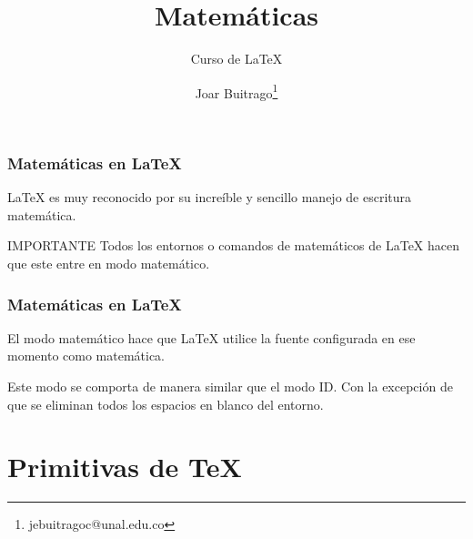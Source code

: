 \documentclass[12pt,aspectratio=169,ignorenonframetext]{ltxbeamer}
\title{Matemáticas}
\subtitle{Curso de {\lmr\LaTeX}}
\author{Joar Buitrago\texorpdfstring{\thanks{jebuitragoc@unal.edu.co}}{ <jebuitragoc@unal.edu.co>}}
\date{}
\begin{document}
\begin{frame}
\titlepage
\end{frame}



\begin{frame}
\frametitle{Matemáticas en {\lmr\LaTeX}}

{\lmr\LaTeX} es muy reconocido por su increíble y sencillo manejo de escritura matemática.

\pause\bigskip

\begin{alertblock}{IMPORTANTE}
    Todos los entornos o comandos de matemáticos de {\lmr\LaTeX} hacen que este entre en modo matemático.
\end{alertblock}
\end{frame}





\begin{frame}
\frametitle{Matemáticas en {\lmr\LaTeX}}

El modo matemático hace que {\lmr\LaTeX} utilice la fuente configurada en ese momento como matemática.

\pause

Este modo se comporta de manera similar que el modo ID. Con la excepción de que se eliminan todos los espacios en blanco del entorno.

\pause\bigskip

\begingroup
\scriptsize
{}
\endgroup
\end{frame}





\section{Primitivas de {\lmr\TeX}}
\end{document}
